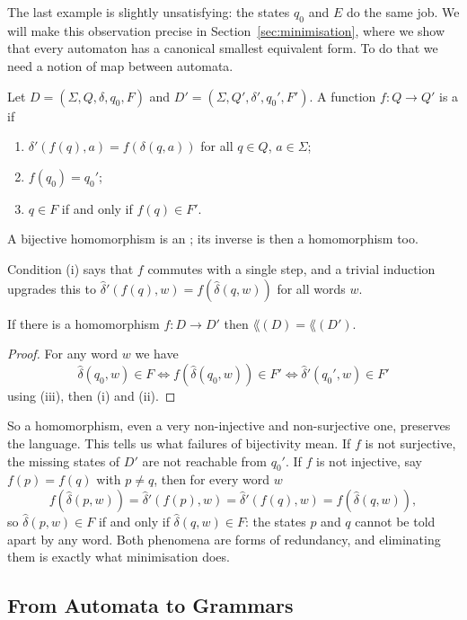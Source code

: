 The last example is slightly unsatisfying: the states $q_0$ and $E$ do the same job. We will make this observation precise in Section~\ref{sec:minimisation}, where we show that every automaton has a canonical smallest equivalent form. To do that we need a notion of map between automata.

\begin{definition}[Homomorphism]
	Let $D = (\Sigma, Q, \delta, q_0, F)$ and $D' = (\Sigma, Q', \delta', q_0', F')$. A function $f \colon Q \to Q'$ is a  if
	\begin{enumerate}[label=(\roman*)]
		\item $\delta'(f(q), a) = f(\delta(q,a))$ for all $q \in Q$, $a \in \Sigma$;
		\item $f(q_0) = q_0'$;
		\item $q \in F$ if and only if $f(q) \in F'$.
	\end{enumerate}
	A bijective homomorphism is an ; its inverse is then a homomorphism too.
\end{definition}

Condition (i) says that $f$ commutes with a single step, and a trivial induction upgrades this to $\hat\delta'(f(q), w) = f(\hat\delta(q,w))$ for all words $w$.

\begin{proposition}\label{prop:homlanguage}
	If there is a homomorphism $f \colon D \to D'$ then $\lang(D) = \lang(D')$.
\end{proposition}

\begin{proof}
	For any word $w$ we have
	$$\hat\delta(q_0, w) \in F \iff f(\hat\delta(q_0,w)) \in F' \iff \hat\delta'(q_0', w) \in F'$$
	using (iii), then (i) and (ii). \end{proof}

So a homomorphism, even a very non-injective and non-surjective one, preserves the language. This tells us what failures of bijectivity mean. If $f$ is not surjective, the missing states of $D'$ are not reachable from $q_0'$. If $f$ is not injective, say $f(p) = f(q)$ with $p \neq q$, then for every word $w$
$$f(\hat\delta(p,w)) = \hat\delta'(f(p),w) = \hat\delta'(f(q),w) = f(\hat\delta(q,w)),$$
so $\hat\delta(p,w) \in F$ if and only if $\hat\delta(q,w) \in F$: the states $p$ and $q$ cannot be told apart by any word. Both phenomena are forms of redundancy, and eliminating them is exactly what minimisation does.

\subsection{From Automata to Grammars}

